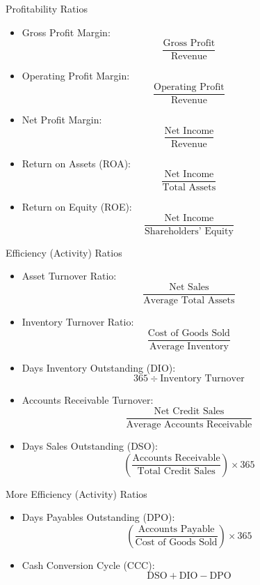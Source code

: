 \documentclass[10pt]{beamer}
\begin{document}
\begin{frame}{Profitability Ratios}
  \begin{itemize}
    \item Gross Profit Margin:
    \[
      \frac{\text{Gross Profit}}{\text{Revenue}}
    \]

    \item Operating Profit Margin:
    \[
      \frac{\text{Operating Profit}}{\text{Revenue}}
    \]

    \item Net Profit Margin:
    \[
      \frac{\text{Net Income}}{\text{Revenue}}
    \]

    \item Return on Assets (ROA):
    \[
      \frac{\text{Net Income}}{\text{Total Assets}}
    \]

    \item Return on Equity (ROE):
    \[
      \frac{\text{Net Income}}{\text{Shareholders' Equity}}
    \]
  \end{itemize}
\end{frame}

\begin{frame}{Efficiency (Activity) Ratios}
  \begin{itemize}
    \item Asset Turnover Ratio:
    \[
      \frac{\text{Net Sales}}{\text{Average Total Assets}}
    \]

    \item Inventory Turnover Ratio:
    \[
      \frac{\text{Cost of Goods Sold}}{\text{Average Inventory}}
    \]

    \item Days Inventory Outstanding (DIO):
    \[
      365 \div \text{Inventory Turnover}
    \]

    \item Accounts Receivable Turnover:
    \[
      \frac{\text{Net Credit Sales}}{\text{Average Accounts Receivable}}
    \]

    \item Days Sales Outstanding (DSO):
    \[
      \left(\frac{\text{Accounts Receivable}}{\text{Total Credit Sales}}\right)
      \times 365
    \]
  \end{itemize}
\end{frame}
\begin{frame}{More Efficiency (Activity) Ratios}
  \begin{itemize}
    \item Days Payables Outstanding (DPO):
    \[
      \left(\frac{\text{Accounts Payable}}{\text{Cost of Goods Sold}}\right)
      \times 365
    \]

    \item Cash Conversion Cycle (CCC):
    \[
      \text{DSO} + \text{DIO} - \text{DPO}
    \]
  \end{itemize}
\end{frame}
\end{document}
